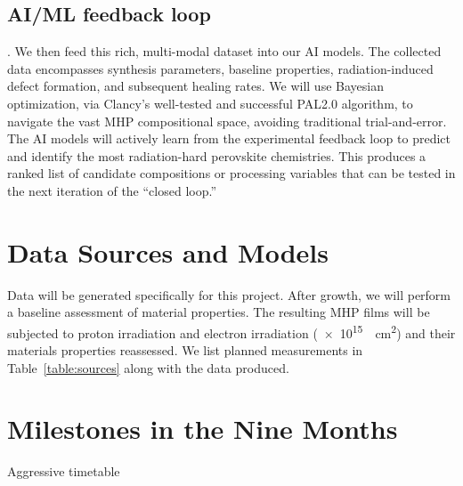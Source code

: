 \documentclass[pgs]{DOE}
\newcommand{\mnote}[1]{{\marginpar{\color{red} #1}}}
\newcommand{\myclearpage}{\clearpage}
\begin{document}
\subsection{AI/ML feedback loop}.  
We then feed this rich, multi-modal dataset into our AI models.
The collected data encompasses synthesis parameters, baseline properties, radiation-induced defect formation, and subsequent healing rates. 
We will use Bayesian optimization, via Clancy's well-tested and successful PAL2.0 algorithm, to navigate the vast MHP compositional space, avoiding traditional trial-and-error.
The AI models will actively learn from the experimental feedback loop to predict and identify the most radiation-hard perovskite chemistries.
This produces a ranked list of candidate compositions or processing variables that can be tested in the next iteration of the ``closed loop.''


\myclearpage
\section{Data Sources and Models}
\mnote{0.5 page}
%
% 
% 



Data will be generated specifically for this project.
After growth, we will perform a baseline assessment of material properties.
The resulting MHP films will be subjected to proton irradiation and electron irradiation (\SI{e15}{\per\square\centi\meter}) and their materials properties reassessed. 
We list planned measurements in Table~\ref{table:sources} along with the data produced.

\myclearpage
\section{Milestones in the Nine Months}
\mnote{1 page}
%
% 
Aggressive timetable
\end{document}
